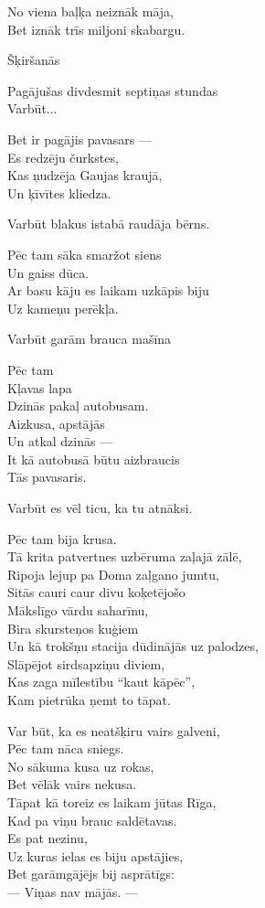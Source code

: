 \documentclass[14pt]{extarticle}
\begin{document}
No viena baļķa neiznāk māja,\\
Bet iznāk trīs miljoni skabargu.


\newpage

{\large \sc Šķiršanās}

Pagājušas divdesmit septiņas stundas\\
Varbūt...

Bet ir pagājis pavasars ---\\
Es redzēju čurkstes,\\
Kas ņudzēja Gaujas kraujā,\\
Un ķīvītes kliedza.

Varbūt blakus istabā raudāja bērns.

Pēc tam sāka smaržot siens\\
Un gaiss dūca.\\
Ar basu kāju es laikam uzkāpis biju\\
Uz kameņu perēkļa.

Varbūt garām brauca mašīna

Pēc tam\\
Kļavas lapa\\
Dzinās pakaļ autobusam.\\
Aizkusa, apstājās\\
Un atkal dzinās ---\\
It kā autobusā būtu aizbraucis\\
Tās pavasaris.

Varbūt es vēl ticu, ka tu atnāksi.

Pēc tam bija krusa.\\
Tā krita patvertnes uzbēruma zaļajā zālē,\\
Ripoja lejup pa Doma zaļgano jumtu,\\
Sitās cauri caur divu koķetējošo\\
Mākslīgo vārdu saharīnu,\\
Bira skursteņos kuģiem\\
Un kā trokšņu stacija dūdinājās uz palodzes,\\
Slāpējot sirdsapziņu diviem,\\
Kas zaga mīlestību ``kaut kāpēc'',\\
Kam pietrūka ņemt to tāpat.

Var būt, ka es neatšķiru vairs galveni,\\
Pēc tam nāca sniegs.\\
No sākuma kusa uz rokas,\\
Bet vēlāk vairs nekusa.\\
Tāpat kā toreiz es laikam jūtas Rīga,\\
Kad pa viņu brauc saldētavas.\\
Es pat nezinu,\\
Uz kuras ielas es biju apstājies,\\
Bet garāmgājējs bij asprātīgs:\\
--- Viņas nav mājās. ---
\end{document}
